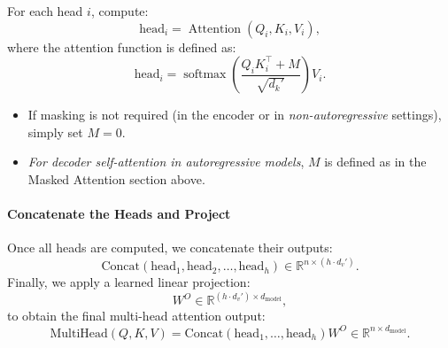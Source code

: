    For each head \(i\), compute:
   \[
   \text{head}_i = \operatorname{Attention}(Q_i, K_i, V_i),
   \]
   where the attention function is defined as:
   \[
   \text{head}_i = \operatorname{softmax}\!\left(\frac{Q_iK_i^\top + M}{\sqrt{d_k'}}\right) V_i.
   \]
   \begin{itemize}
	   \item If masking is not required (\eg in the encoder or in \textit{non-autoregressive} settings), simply set \(M = 0\).
	   \item \textit{For decoder self-attention in autoregressive models}, \(M\) is defined as in the Masked Attention section above.
   \end{itemize}

\paragraph{Concatenate the Heads and Project}

   Once all heads are computed, we concatenate their outputs:
   \[
   \text{Concat}(\text{head}_1, \text{head}_2, \dots, \text{head}_h) \in \mathbb{R}^{n \times (h \cdot d_v')}.
   \]
   Finally, we apply a learned linear projection:
   \[
   W^O \in \mathbb{R}^{(h \cdot d_v') \times d_{\text{model}}},
   \]
   to obtain the final multi-head attention output:
   \[
   \text{MultiHead}(Q, K, V) = \text{Concat}(\text{head}_1, \dots, \text{head}_h) W^O \in \mathbb{R}^{n \times d_{\text{model}}}.
   \]

   
